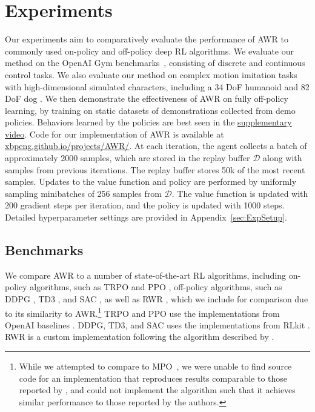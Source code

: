 \section{Experiments}
\label{sec:Experiments}
Our experiments aim to comparatively evaluate the performance of AWR to commonly used on-policy and off-policy deep RL algorithms. We evaluate our method on the OpenAI Gym benchmarks~\citep{OpenAIGym}, consisting of discrete and continuous control tasks. We also evaluate our method on complex motion imitation tasks with high-dimensional simulated characters, including a 34 DoF humanoid and 82 DoF dog \citep{2018-TOG-deepMimic}. We then demonstrate the effectiveness of AWR on fully off-policy learning, by training on static datasets of demonstrations collected from demo policies. Behaviors learned by the policies are best seen in the \href{https://xbpeng.github.io/projects/AWR/}{supplementary video}.
Code for our implementation of AWR is available at \href{https://xbpeng.github.io/projects/AWR/}{xbpeng.github.io/projects/AWR/}. At each iteration, the agent collects a batch of approximately 2000 samples, which are stored in the replay buffer $\mathcal{D}$ along with samples from previous iterations. The replay buffer stores 50k of the most recent samples. Updates to the value function and policy are performed by uniformly sampling minibatches of 256 samples from $\mathcal{D}$. The value function is updated with 200 gradient steps per iteration, and the policy is updated with 1000 steps. Detailed hyperparameter settings are provided in Appendix~\ref{sec:ExpSetup}.

\subsection{Benchmarks}
We compare AWR to a number of state-of-the-art RL algorithms, including on-policy algorithms, such as TRPO \citep{TRPOschulman15} and PPO \citep{PPOSchulmanWDRK17}, off-policy algorithms, such as DDPG \citep{DDPG2016}, TD3 \citep{fujimoto18a}, and SAC \citep{SAC18}, as well as RWR \citep{Peters2007RWR}, which we include for comparison due to its similarity to AWR.\footnote{While we attempted to compare to MPO~\citep{abdolmaleki2018maximum}, we were unable to find source code for an implementation that reproduces results comparable to those reported by \citet{abdolmaleki2018maximum}, and could not implement the algorithm such that it achieves similar performance to those reported by the authors.} TRPO and PPO use the implementations from OpenAI baselines \citep{baselines}. DDPG, TD3, and SAC uses the implementations from RLkit \citep{rlkit}. RWR is a custom implementation following the algorithm described by \citet{Peters2007RWR}.

